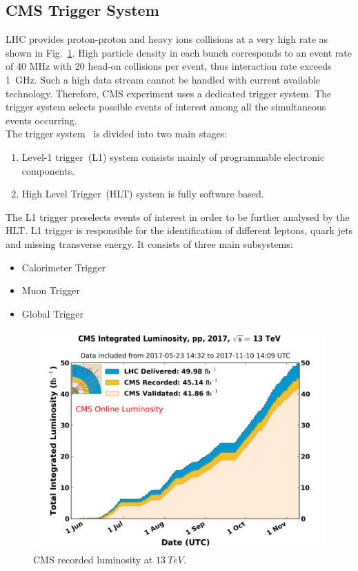 \subsection{CMS Trigger System}
LHC provides proton-proton and heavy ions collisions at a very high rate as shown in Fig.~\ref{recoreder_lumi}. High particle density in each bunch corresponds to an event rate of 40 MHz with 20 head-on collisions per event, thus interaction rate exceeds 1~GHz. Such a high data stream cannot be handled with current available technology. Therefore, CMS experiment uses a dedicated trigger system. The trigger system selects possible events of interest among all the simultaneous events occurring.\\
The trigger system~\cite{Khachatryan_2017} is divided into two main stages:\\
\begin{enumerate}
\item Level-1 trigger~(L1) system consists mainly of programmable electronic components.
\item High Level Trigger~(HLT) system is fully software based.
\end{enumerate} 
The L1 trigger preselects events of interest in order to be further analysed by the HLT. L1 trigger is responsible for the identification of different leptons, quark jets and missing transverse energy. It consists of three main subsystems:
\begin{itemize}
\item Calorimeter Trigger
\item Muon Trigger
\item Global Trigger
\end{itemize}  

\begin{figure}[H]
\centering
\includegraphics[scale=0.5]{chapter2/cms luminosity.png}
\caption{CMS recorded luminosity at $13~TeV$.}
\label{recoreder_lumi}
\end{figure} 


